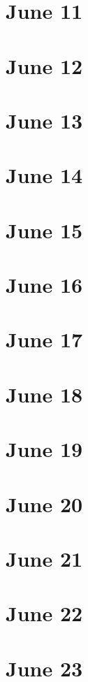 \section{June 11}

\section{June 12}

\section{June 13}

\section{June 14}

\section{June 15}

\section{June 16}

\section{June 17}

\section{June 18}

\section{June 19}

\section{June 20}

\section{June 21}

\section{June 22}

\section{June 23}

